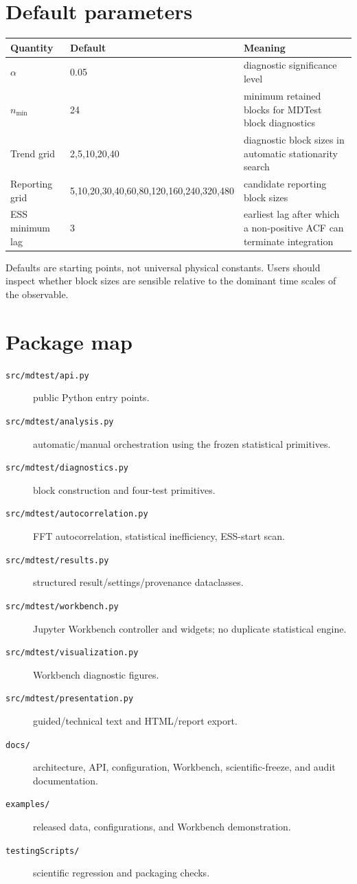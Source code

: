 \documentclass[11pt,oneside]{report}
\begin{document}
\chapter{Default parameters}
\begin{center}
\begin{tabularx}{\textwidth}{l l Y}
\toprule
Quantity & Default & Meaning\\
\midrule
$\alpha$ & 0.05 & diagnostic significance level\\
$n_{\min}$ & 24 & minimum retained blocks for MDTest block diagnostics\\
Trend grid & 2,5,10,20,40 & diagnostic block sizes in automatic stationarity search\\
Reporting grid & 5,10,20,30,40,60,80,120,160,240,320,480 & candidate reporting block sizes\\
ESS minimum lag & 3 & earliest lag after which a non-positive ACF can terminate integration\\
\bottomrule
\end{tabularx}
\end{center}
Defaults are starting points, not universal physical constants. Users should inspect whether block sizes are sensible relative to the dominant time scales of the observable.

\chapter{Package map}
\begin{description}
\item[\texttt{src/mdtest/api.py}] public Python entry points.
\item[\texttt{src/mdtest/analysis.py}] automatic/manual orchestration using the frozen statistical primitives.
\item[\texttt{src/mdtest/diagnostics.py}] block construction and four-test primitives.
\item[\texttt{src/mdtest/autocorrelation.py}] FFT autocorrelation, statistical inefficiency, ESS-start scan.
\item[\texttt{src/mdtest/results.py}] structured result/settings/provenance dataclasses.
\item[\texttt{src/mdtest/workbench.py}] Jupyter Workbench controller and widgets; no duplicate statistical engine.
\item[\texttt{src/mdtest/visualization.py}] Workbench diagnostic figures.
\item[\texttt{src/mdtest/presentation.py}] guided/technical text and HTML/report export.
\item[\texttt{docs/}] architecture, API, configuration, Workbench, scientific-freeze, and audit documentation.
\item[\texttt{examples/}] released data, configurations, and Workbench demonstration.
\item[\texttt{testingScripts/}] scientific regression and packaging checks.
\end{description}
\end{document}
